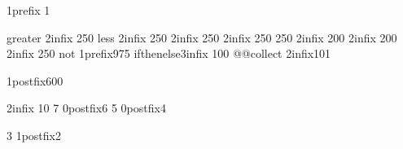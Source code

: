 \pgfmathdeclareoperator{<} {}       {1}{prefix} {1}

\pgfmathdeclareoperator{>} {greater}   {2}{infix} {250}
\pgfmathdeclareoperator{<} {less}      {2}{infix} {250}
     {2}{infix} {250}
   {2}{infix} {250}
 {250}
       {2}{infix} {200}
        {2}{infix} {200}
  {2}{infix} {250}
\pgfmathdeclareoperator{!} {not}       {1}{prefix}{975}
 {ifthenelse}{3}{infix} {100}
\pgfmathdeclareoperator{:} {@@collect}  {2}{infix}{101}

      {1}{postfix}{600}

   {2}{infix}  {10}
\pgfmathdeclareoperator{[}{@startindex}{2}{prefix} {7}
\pgfmathdeclareoperator{]}{@endindex}  {0}{postfix}{6}
 {5}
  {0}{postfix}{4}

 {3}
  {1}{postfix}{2}%



%
\def\pgfmath@startgroup@#1{\pgfmath@protected@edef\pgfmathresult{#1}}
\def\pgfmath@endgroup@{}%

%
\def\pgfmath@startindex@#1#2{%
  \expandafter\pgfmatharray@#1{#2}%
  \expandafter\pgfmath@bgroup@strip\expandafter{\pgfmathresult}%
  \ifx\pgfmath@token@let\bgroup%
    \expandafter\def\expandafter\pgfmathresult\expandafter{\expandafter{\pgfmathresult}}%
  \fi}
\def\pgfmath@endindex@{}%

%
\def\pgfmath@startarray@#1{\expandafter\def\expandafter\pgfmathresult\expandafter{\expandafter{#1}}}
\def\pgfmath@endarray@#1{\expandafter\def\expandafter\pgfmathresult\expandafter{#1}}%


